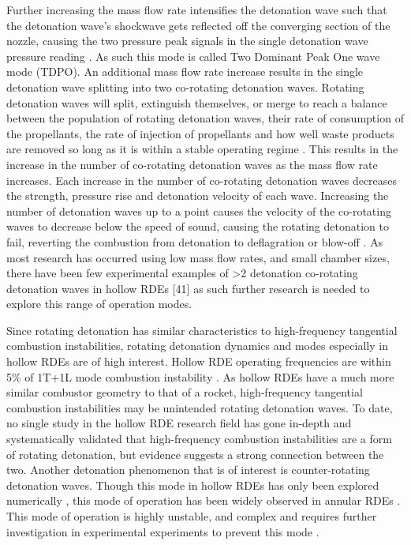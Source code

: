 \documentclass{article}
\begin{document}
Further increasing the mass flow rate intensifies the detonation wave such that the detonation wave’s shockwave gets reflected off the converging section of the nozzle, causing the two pressure peak signals in the single detonation wave pressure reading \cite{Huang2019,1Huang2019}. As such this mode is called Two Dominant Peak One wave mode (TDPO). An additional mass flow rate increase results in the single detonation wave splitting into two co-rotating detonation waves. Rotating detonation waves will split, extinguish themselves, or merge to reach a balance between the population of rotating detonation waves, their rate of consumption of the propellants, the rate of injection of propellants and how well waste products are removed so long as it is within a stable operating regime \cite{1Rong2022,Smith2021}. This results in the increase in the number of co-rotating detonation waves as the mass flow rate increases. Each increase in the number of co-rotating detonation waves decreases the strength, pressure rise and detonation velocity of each wave. Increasing the number of detonation waves up to a point causes the velocity of the co-rotating waves to decrease below the speed of sound, causing the rotating detonation to fail, reverting the combustion from detonation to deflagration or blow-off \cite{Andrus2017}. As most research has occurred using low mass flow rates, and small chamber sizes, there have been few experimental examples of >2 detonation co-rotating detonation waves in hollow RDEs [41] as such further research is needed to explore this range of operation modes.
\par

Since rotating detonation has similar characteristics to high-frequency tangential combustion instabilities, rotating detonation dynamics and modes especially in hollow RDEs are of high interest. Hollow RDE operating frequencies are within 5\% of 1T+1L mode combustion instability \cite{Zhang2021}. As hollow RDEs have a much more similar combustor geometry to that of a rocket, high-frequency tangential combustion instabilities may be unintended rotating detonation waves. To date, no single study in the hollow RDE research field has gone in-depth and systematically validated that high-frequency combustion instabilities are a form of rotating detonation, but evidence suggests a strong connection between the two. Another detonation phenomenon that is of interest is counter-rotating detonation waves. Though this mode in hollow RDEs has only been explored numerically \cite{1Rong2022,2Rong2022}, this mode of operation has been widely observed in annular RDEs \cite{Zhao2020}. This mode of operation is highly unstable, and complex and requires further investigation in experimental experiments to prevent this mode \cite{2Rong2022}.
\end{document}
